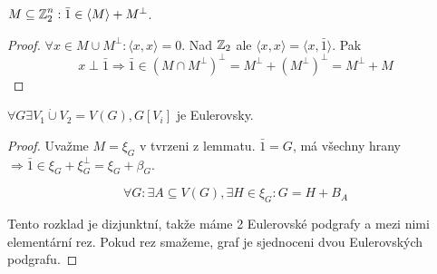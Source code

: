 \begin{lemma}
	$M \subseteq \operatorname{\mathbb{Z}}_2^n : \bar{1} \in \langle M \rangle + M^{\perp}$.
\end{lemma}
\begin{proof}
	$\forall x \in M \cup M^{\perp}: \langle x, x \rangle = 0$. Nad $\operatorname{\mathbb{Z}}_2$ ale $\langle x, x \rangle = \langle x, \bar{1} \rangle$. Pak
	\[ x \perp \bar{1} \Rightarrow \bar{1} \in (M \cap M^{\perp})^{\perp} = M^{\perp} + (M^{\perp})^{\perp} = M^{\perp} + M \]
\end{proof}

\begin{theorem}
	$\forall G \exists V_1 \mathbin{\dot{\cup}} V_2 = V(G), G[V_i]$ je Eulerovsky.
\end{theorem}
\begin{proof}
	Uvažme $M = \xi_G$ v tvrzeni z lemmatu. $\bar{1} = G$, má všechny hrany $\Rightarrow \bar{1} \in \xi_G + \xi_G^{\perp} = \xi_G + \beta_G$.

	\[ \forall G: \exists A \subseteq V(G), \exists H\in \xi_G: G = H + B_A \]

	Tento rozklad je dizjunktní, takže máme 2 Eulerovské podgrafy a mezi nimi elementární rez. Pokud rez smažeme, graf je sjednoceni dvou Eulerovských podgrafu.

\end{proof}

